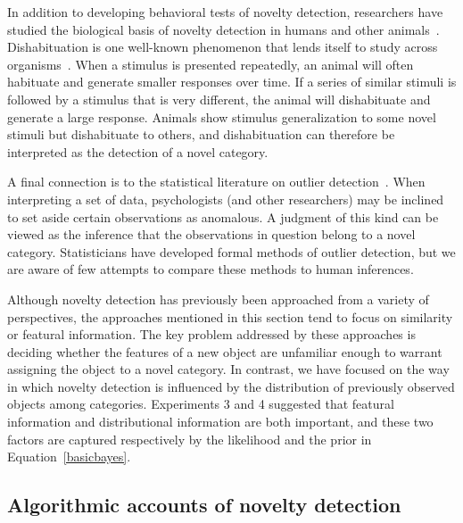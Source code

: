 \documentclass[doc]{apa6}
\begin{document}
In addition to developing behavioral tests of novelty detection, researchers have studied the biological basis of novelty detection in humans and other animals~\cite{marsland2003novelty}. Dishabituation is one well-known phenomenon that lends itself to study across organisms~\cite{thompson1966habituation}. When a stimulus is presented repeatedly, an animal will often habituate and generate smaller responses over time. If a series of similar stimuli is followed by a stimulus that is very different, the animal will dishabituate and generate a large response. Animals show stimulus generalization to some novel stimuli but dishabituate to others, and dishabituation can therefore be interpreted as the detection of a novel category.

A final connection is to the statistical literature on outlier detection~\cite{hodge2004survey}. When interpreting a set of data, psychologists (and other researchers) may be inclined to set aside certain observations as anomalous. A judgment of this kind can be viewed as the inference that the observations in question belong to a novel category. Statisticians have developed formal methods of outlier detection, but we are aware of few attempts to compare these methods to human inferences.

Although novelty detection has previously been approached from a variety of perspectives, the approaches mentioned in this section tend to focus on similarity or featural information. The key problem addressed by these approaches is deciding whether the features of a new object are unfamiliar enough to warrant assigning the object to a novel category. In contrast, we have focused on the way in which novelty detection is influenced by the distribution of previously observed objects among categories. Experiments 3 and 4 suggested that featural information and distributional information are both important, and these two factors are captured respectively by the likelihood and the prior in Equation~\ref{basicbayes}.

\subsection{Algorithmic accounts of novelty detection}
\end{document}
